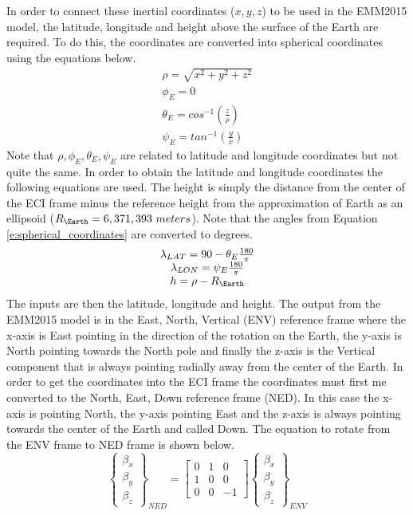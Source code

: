 \documentclass{article}
\begin{document}
\noindent In order to connect these inertial coordinates ($x,y,z$) to
be used in the EMM2015 model, the latitude, longitude and height above
the surface of the Earth are required. To do this, the coordinates are
converted into spherical coordinates using the equations below.
\begin{equation}\label{e:spherical_coordinates}
  \begin{matrix}
    \rho = \sqrt{x^2+y^2+z^2} \\
    \phi_E = 0 \\
    \theta_E = cos^{-1}\left( \frac{z}{\rho}\right) \\
    \psi_E = tan^{-1}\left( \frac{y}{x}\right)
  \end{matrix}
\end{equation}
Note that $\rho,\phi_E,\theta_E,\psi_E$ are related to latitude and
longitude coordinates but not quite the same. In order to obtain the
latitude and longitude coordinates the following equations are
used. The height is simply the distance from the center of the ECI
frame minus the reference height from the approximation of Earth as an
ellipsoid ($R_{\Earth}=6,371,393~meters$). Note that the angles from Equation
\ref{e:spherical_coordinates} are converted to degrees. 
\begin{equation}
  \begin{matrix}
    \lambda_{LAT} = 90 - \theta_E\frac{180}{\pi}\\
    \lambda_{LON} = \psi_E\frac{180}{\pi} \\
    h = \rho - R_{\Earth}
  \end{matrix}
\end{equation}
The inputs are then the latitude, longitude and height. The output
from the EMM2015 model is in the East, North, Vertical (ENV) reference frame
where the x-axis is East pointing in the direction of the rotation on
the Earth, the y-axis is North pointing towards the North pole and
finally the z-axis is the Vertical component that is always pointing
radially away from the center of the Earth. In order to get the
coordinates into the ECI frame the coordinates must first me converted
to the North, East, Down reference frame (NED). In this case the
x-axis is pointing North, the y-axis pointing East and the z-axis is
always pointing towards the center of the Earth and called Down. The
equation to rotate from the ENV frame to NED frame is shown below.
\begin{equation}
  \begin{Bmatrix} \beta_x \\ \beta_y \\ \beta_z \end{Bmatrix}_{NED}
  = \begin{bmatrix} 0 & 1 & 0 \\ 1 & 0 & 0 \\ 0 & 0 & -1 \end{bmatrix} \begin{Bmatrix} \beta_x \\ \beta_y \\ \beta_z \end{Bmatrix}_{ENV}
\end{equation}
\end{document}
